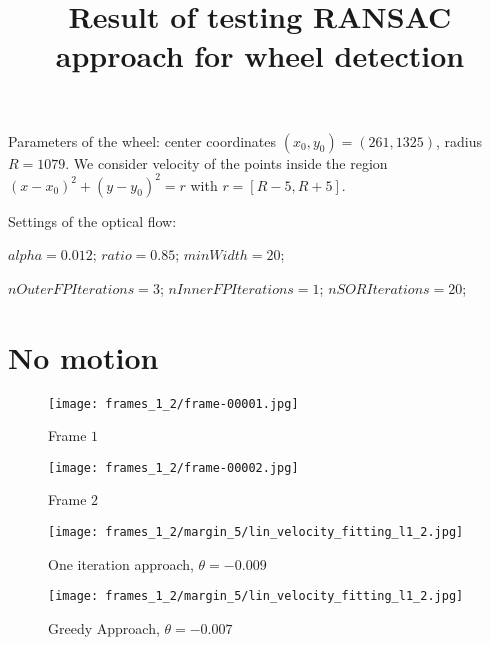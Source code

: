 \documentclass[
	fontsize=12pt,
	paper=a4,
	twoside=false,
	numbers=noenddot,
	plainheadsepline,
	toc=listof,
	toc=bibliography
]{scrartcl}
\title{Result of testing RANSAC approach for wheel detection}
\begin{document}
\maketitle

Parameters of the wheel: center coordinates $(x_0, y_0) = (261, 1325)$, radius $R = 1079$.
We consider velocity of the points inside the region $(x-x_0)^2 + (y-y_0)^2 = r$ with $r=[R-5, R+5]$.

Settings of the optical flow:

$alpha = 0.012$;
$ratio = 0.85$;
$minWidth = 20$;

$nOuterFPIterations = 3$;
$nInnerFPIterations = 1$;
$nSORIterations = 20$;

\section*{No motion}

\begin{minipage}{\linewidth}
      \centering
      \begin{minipage}{0.45\linewidth}
          \begin{figure}[H]
              \texttt{[image: frames\_1\_2/frame-00001.jpg]}
              \caption{Frame $1$}
          \end{figure}
      \end{minipage}
      \hspace{0.05\linewidth}
      \begin{minipage}{0.45\linewidth}
          \begin{figure}[H]
              \texttt{[image: frames\_1\_2/frame-00002.jpg]}
              \caption{Frame $2$}
          \end{figure}
      \end{minipage}
\end{minipage}
\FloatBarrier

\begin{minipage}{\linewidth}
      \centering
      \begin{minipage}{0.45\linewidth}
          \begin{figure}[H]
              \texttt{[image: frames\_1\_2/margin\_5/lin\_velocity\_fitting\_l1\_2.jpg]}
              \caption{One iteration approach, $\theta = -0.009$}
          \end{figure}
      \end{minipage}
      \hspace{0.05\linewidth}
      \begin{minipage}{0.45\linewidth}
          \begin{figure}[H]
              \texttt{[image: frames\_1\_2/margin\_5/lin\_velocity\_fitting\_l1\_2.jpg]}
              \caption{Greedy Approach, $\theta = -0.007$}
          \end{figure}
      \end{minipage}
\end{minipage}
\end{document}
